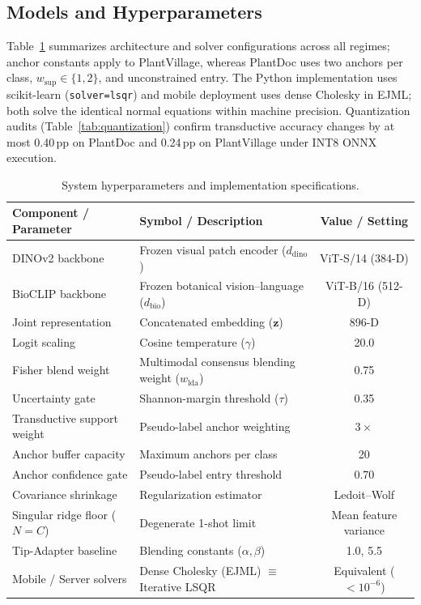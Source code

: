 \subsection{Models and Hyperparameters}
Table~\ref{tab:hyperparameters} summarizes architecture and solver configurations across all regimes; anchor constants apply to PlantVillage, whereas PlantDoc uses two anchors per class, $w_{\text{sup}}\in\{1,2\}$, and unconstrained entry. The Python implementation uses scikit-learn (\texttt{solver=lsqr}) and mobile deployment uses dense Cholesky in EJML; both solve the identical normal equations within machine precision. Quantization audits (Table~\ref{tab:quantization}) confirm transductive accuracy changes by at most 0.40\,pp on PlantDoc and 0.24\,pp on PlantVillage under INT8 ONNX execution.

\begin{table}[htbp]
\caption{System hyperparameters and implementation specifications.}
\label{tab:hyperparameters}
\centering
\footnotesize
\setlength{\tabcolsep}{4pt}
\begin{tabularx}{\columnwidth}{@{}l X c@{}}
\toprule
\textbf{Component / Parameter} & \textbf{Symbol / Description} & \textbf{Value / Setting} \\
\midrule
DINOv2 backbone & Frozen visual patch encoder ($d_{\text{dino}}$) & ViT-S/14 (384-D) \\
BioCLIP backbone & Frozen botanical vision--language ($d_{\text{bio}}$) & ViT-B/16 (512-D) \\
Joint representation & Concatenated embedding ($\mathbf{z}$) & 896-D \\
Logit scaling & Cosine temperature ($\gamma$) & 20.0 \\
Fisher blend weight & Multimodal consensus blending weight ($w_{\text{lda}}$) & 0.75 \\
Uncertainty gate & Shannon-margin threshold ($\tau$) & 0.35 \\
Transductive support weight & Pseudo-label anchor weighting & $3\times$ \\
Anchor buffer capacity & Maximum anchors per class & 20 \\
Anchor confidence gate & Pseudo-label entry threshold & 0.70 \\
Covariance shrinkage & Regularization estimator & Ledoit--Wolf \\
Singular ridge floor ($N=C$) & Degenerate 1-shot limit & Mean feature variance \\
Tip-Adapter baseline & Blending constants ($\alpha, \beta$) & 1.0, 5.5 \\
Mobile / Server solvers & Dense Cholesky (EJML) $\equiv$ Iterative LSQR & Equivalent ($<10^{-6}$) \\
\bottomrule
\end{tabularx}
\end{table}

